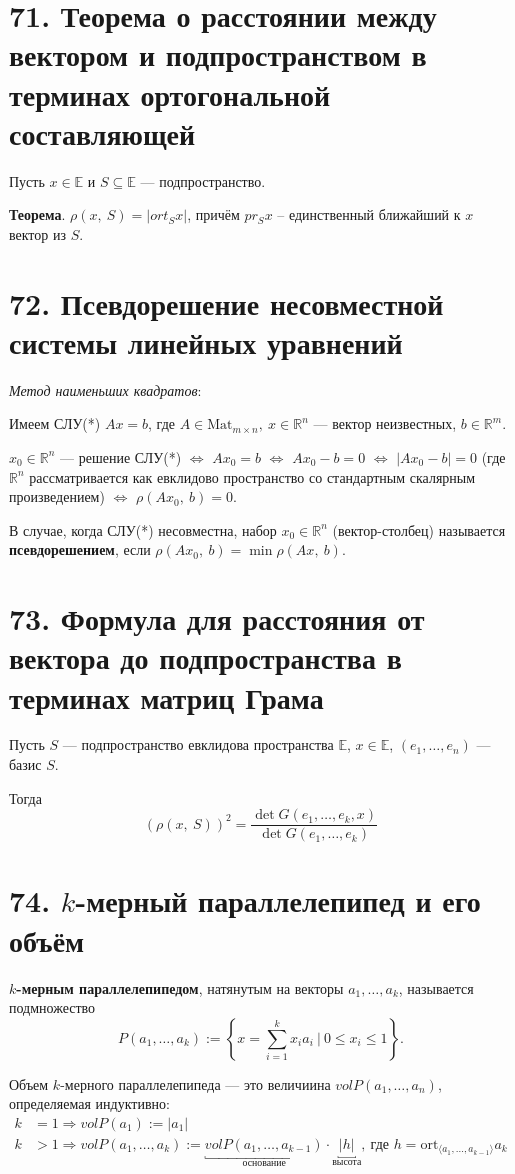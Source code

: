 \documentclass[a4paper, 12pt]{article}
\newcommand{\E}{\mathbb{E}}
\newcommand{\R}{\mathbb{R}}
\begin{document}
\section*{71. Теорема о расстоянии между вектором и подпространством в терминах ортогональной составляющей}
Пусть $x \in \E$ и $S \subseteq \E$ --- подпространство.

\textbf{Теорема}. $\rho(x,\ S) = |ort_Sx|$, причём $pr_Sx$ -- единственный ближайший к $x$ вектор из $S$.

\section*{72. Псевдорешение несовместной системы линейных уравнений}
\textit{Метод наименьших квадратов}:

Имеем СЛУ(*) $Ax = b$, где $A \in \text{Mat}_{m \times n},\ x \in \R^n$ --- вектор неизвестных, $b \in \R^m$.

$x_0 \in \R^n$ --- решение СЛУ(*) $\Leftrightarrow$ $Ax_0 = b$ $\Leftrightarrow$ $Ax_0 - b = 0$ $\Leftrightarrow$ $|Ax_0 - b| = 0$ (где $\R^n$ рассматривается как евклидово пространство со стандартным скалярным произведением) $\Leftrightarrow$ $\rho(Ax_0,\ b) = 0$.

В случае, когда СЛУ(*) несовместна, набор $x_0 \in \R^n$ (вектор-столбец) называется \textbf{псевдорешением}, если $\rho(Ax_0,\ b) = \min\rho(Ax,\ b)$.

\section*{73. Формула для расстояния от вектора до подпространства в терминах матриц Грама}
Пусть $S$ --- подпространство евклидова пространства $\E$, $x \in \E$, $(e_1, \ldots, e_n)$ --- базис $S$.

Тогда
\[
(\rho(x,\ S))^2 =  \dfrac{\det G(e_1, \ldots, e_k, x)}{\det G(e_1, \ldots, e_k)}
\]

\section*{74. $k$-мерный параллелепипед и его объём}
\textbf{$k$-мерным параллелепипедом}, натянутым на векторы $a_1, \ldots, a_k$, называется подмножество
\[
P(a_1, \ldots, a_k) := \left\{ x = \sum_{i = 1}^{k} x_ia_i\ |\ 0 \leqslant x_i \leqslant 1 \right\}.
\]

Объем $k$-мерного параллелепипеда --- это величиина $volP(a_1, \ldots, a_n)$, определяемая индуктивно:
\begin{align*}
k &= 1 \Rightarrow volP(a_1) := |a_1| \\
k &> 1 \Rightarrow volP(a_1, \ldots, a_k) := \underbracket{volP(a_1, \ldots, a_{k - 1})}_{\text{основание}} \cdot \underbracket{|h|}_{\text{высота}},\ \text{где $h = \text{ort}_{\langle a_1, \ldots, a_{k - 1}\rangle}a_k$}
\end{align*}
\end{document}
